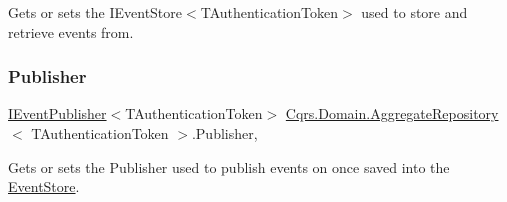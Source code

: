 Gets or sets the I\+Event\+Store$<$\+T\+Authentication\+Token$>$ used to store and retrieve events from. 

\mbox{\label{classCqrs_1_1Domain_1_1AggregateRepository_a6388abb96d4480c6141f5d5e469a2ca0_a6388abb96d4480c6141f5d5e469a2ca0}} 
\subsubsection{\texorpdfstring{Publisher}{Publisher}}
{\footnotesize\ttfamily \hyperlink{interfaceCqrs_1_1Events_1_1IEventPublisher}{I\+Event\+Publisher}$<$T\+Authentication\+Token$>$ \hyperlink{classCqrs_1_1Domain_1_1AggregateRepository}{Cqrs.\+Domain.\+Aggregate\+Repository}$<$ T\+Authentication\+Token $>$.Publisher\hspace{0.3cm}{\ttfamily [get]}, {\ttfamily [protected]}}



Gets or sets the Publisher used to publish events on once saved into the \hyperlink{namespaceCqrs_1_1EventStore}{Event\+Store}. 

